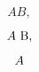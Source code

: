 \documentclass{aa}
\begin{document}
\begin{equation}
  A B,
  \label{eq1}
\end{equation}

\begin{equation}
  A $ B,$
  \label{eq2}
\end{equation}

\begin{equation}
  A $$
  \label{eq3}
\end{equation}
\end{document}
